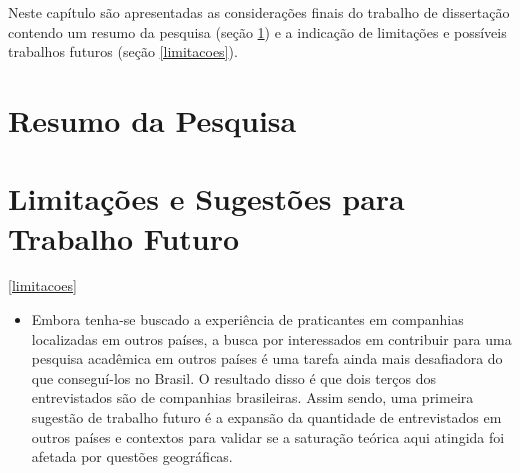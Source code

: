 Neste capítulo são apresentadas as considerações finais do trabalho de
dissertação contendo um resumo da pesquisa (seção \ref{resumo_pesquisa})
e a indicação de limitações e possíveis trabalhos futuros (seção \ref{limitacoes}).

\section{Resumo da Pesquisa}\label{resumo_pesquisa}

\section{Limitações e Sugestões para Trabalho Futuro}\ref{limitacoes}

\begin{itemize}
\item Embora tenha-se buscado a experiência de praticantes em companhias
localizadas em outros países, a busca por interessados em contribuir para uma
pesquisa acadêmica em outros países é uma tarefa ainda mais desafiadora do que
conseguí-los no Brasil. O resultado disso é que dois terços dos entrevistados
são de companhias brasileiras. Assim sendo, uma primeira sugestão de trabalho
futuro é a expansão da quantidade de entrevistados em outros países e contextos
para validar se a saturação teórica aqui atingida foi afetada por questões
geográficas.
\end{itemize}
